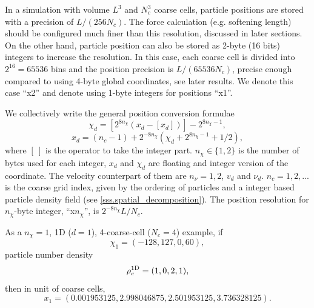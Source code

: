 \documentclass[10pt,twocolumn,preprint]{emulateapj}
\begin{document}
In a simulation with volume $L^3$ and $N_c^3$ coarse cells, particle 
positions are stored with a precision of $L/(256N_c)$. The force calculation 
(e.g. softening length) should be configured much finer than this 
resolution, discussed in later sections. On the other hand, particle 
position can also be stored as 2-byte (16 bits) integers to increase the resolution. 
In this case, each coarse cell is divided into $2^{16}=65536$ bins and the 
position precision is $L/(65536N_c)$, precise enough compared to using
4-byte global coordinates, see later results. We denote this case ``x2'' and 
denote using 1-byte integers for positions ``x1''.

We collectively write the general position conversion formulae
\begin{equation}\label{eq.chi}
	\chi_d=\left[2^{8n_\chi}(x_d-\left[x_d\right])\right]-2^{8n_\chi-1},
\end{equation}
\begin{equation}\label{eq.x}
	x_d=(n_c-1)+2^{-8n_\chi}\left(\chi_d+2^{8n_\chi-1}+1/2\right),
\end{equation}
where $[\ ]$ is the operator to take the integer part. $n_\chi\in\{1,2\}$ is the number of bytes used for each integer, $x_d$ and $\chi_d$ are floating and integer version of the coordinate. The velocity counterpart of them are $n_\nu=1,2$, $v_d$ and $\nu_d$. $n_c=1,2,...$ is the coarse grid index, given by the ordering of particles and a integer based particle density field (see \ref{sss.spatial_decomposition}). The position resolution for $n_\chi$-byte integer, ``x$n_\chi$'', is $2^{-8n_\chi}L/N_c$.

As a $n_\chi=1$, 1D ($d=1$), 4-coarse-cell ($N_c=4$) example, if $$\chi_1=(-128,127,0,60),$$ particle number density $${\rho_c^{\rm 1D}}=(1,0,2,1),$$ then in unit of coarse cells, $$x_1=(0.001953125, 2.998046875, 2.501953125, 3.736328125).$$
\end{document}
